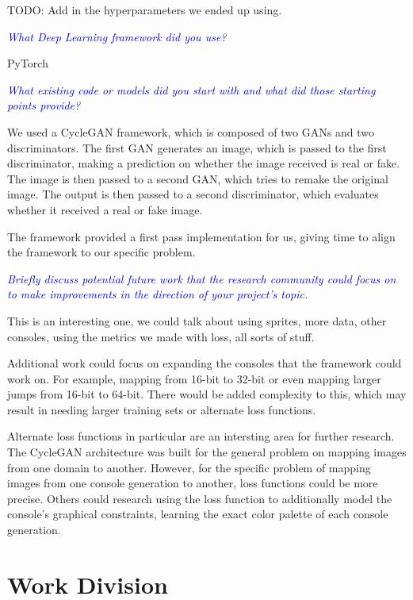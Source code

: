 \documentclass[10pt,twocolumn,letterpaper]{article}
\begin{document}
TODO: Add in the hyperparameters we ended up using.

\textit{\textcolor{blue}{What Deep Learning framework did you use?}}

PyTorch

\textit{\textcolor{blue}{What existing code or models did you start with and what did those starting points provide?}}

We used a CycleGAN framework, which is composed of two GANs and two discriminators. The first GAN generates an image, which is passed to the first discriminator, making a prediction on whether the image received is real or fake. The image is then passed to a second GAN, which tries to remake the original image. The output is then passed to a second discriminator, which evaluates whether it received a real or fake image.

The framework provided a first pass implementation for us, giving time to align the framework to our specific problem.

\textit{\textcolor{blue}{Briefly discuss potential future work that the research community could focus on to make improvements in the direction of your project's topic.}}

This is an interesting one, we could talk about using sprites, more data, other consoles, using the metrics we made with loss, all sorts of stuff.

Additional work could focus on expanding the consoles that the framework could work on. For example, mapping from 16-bit to 32-bit or even mapping larger jumps from 16-bit to 64-bit. There would be added complexity to this, which may result in needing larger training sets or alternate loss functions. 

Alternate loss functions in particular are an intersting area for further research. The CycleGAN architecture was built for the general problem on mapping images from one domain to another. However, for the specific problem of mapping images from one console generation to another, loss functions could be more precise. Others could research using the loss function to additionally model the console's graphical constraints, learning the exact color palette of each console generation.


\section{Work Division}
\end{document}

